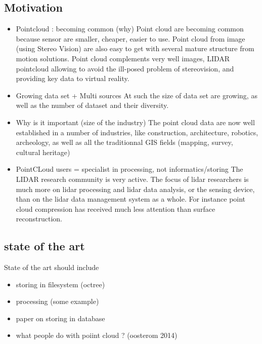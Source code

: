 	\subsection{Motivation}
		\begin{itemize}
			\item Pointcloud : becoming common (why)
				Point cloud are becoming common because sensor are smaller, cheaper, easier to use. Point cloud from image (using Stereo Vision) are also easy to get with several mature structure from motion solutions.
				Point cloud complements very well images, LIDAR pointcloud allowing to avoid the ill-posed problem of stereovision, and providing key data to virtual reality.
			\item Growing data set + Multi sources 
				At such the size of data set are growing, as well as the number of dataset and their diversity.
			\item Why is it important (size of the industry) 
				The point cloud data are now well established in a number of industries, like construction, architecture, robotics, archeology, as well as all the traditionnal GIS fields (mapping, survey, cultural heritage)
			\item PointCLoud users = specialist in processing, not informatics/storing 
				The LIDAR research community is very active. The focus of lidar researchers is much more on lidar processing and lidar data analysis, or the sensing device, than on the lidar data management system as a whole.
				For instance point cloud compression has received much less attention than surface reconstruction.
		\end{itemize}   
	\subsection{state of the art}
		State of the art should include
		\begin{itemize}
			\item storing in filesystem (octree)
			\item processing (some example)
			\item paper on storing in database
			\item what people do with poiint cloud ? (oosterom 2014)
		\end{itemize}
